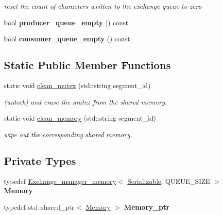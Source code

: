 \begin{DoxyCompactItemize}
\begin{DoxyCompactList}\small\item\em reset the count of characters written to the exchange queue to zero \end{DoxyCompactList}\item 
\mbox{\label{classshared__memory_1_1Exchange__manager__producer_a4a38c8c14004bc46d254375a63f62096}} 
bool {\bfseries producer\+\_\+queue\+\_\+empty} () const
\item 
\mbox{\label{classshared__memory_1_1Exchange__manager__producer_ab8f5eef0601cfdb418eb5d521bfa33d0}} 
bool {\bfseries consumer\+\_\+queue\+\_\+empty} () const
\end{DoxyCompactItemize}
\subsection*{Static Public Member Functions}
\begin{DoxyCompactItemize}
\item 
static void \hyperlink{classshared__memory_1_1Exchange__manager__producer_af98fe4321e1fd280b509f5dfd2cf4a5b}{clean\+\_\+mutex} (std\+::string segment\+\_\+id)
\begin{DoxyCompactList}\small\item\em (unlock) and erase the mutex from the shared memory. \end{DoxyCompactList}\item 
static void \hyperlink{classshared__memory_1_1Exchange__manager__producer_a8574f4e075d6f755e567d21d04f24aab}{clean\+\_\+memory} (std\+::string segment\+\_\+id)
\begin{DoxyCompactList}\small\item\em wipe out the corresponding shared memory. \end{DoxyCompactList}\end{DoxyCompactItemize}
\subsection*{Private Types}
\begin{DoxyCompactItemize}
\item 
\mbox{\label{classshared__memory_1_1Exchange__manager__producer_a65119cf07c0c10f167c191c9ee913029}} 
typedef \hyperlink{classshared__memory_1_1internal_1_1Exchange__manager__memory}{Exchange\+\_\+manager\+\_\+memory}$<$ \hyperlink{classSerializable}{Serializable}, Q\+U\+E\+U\+E\+\_\+\+S\+I\+ZE $>$ {\bfseries Memory}
\item 
\mbox{\label{classshared__memory_1_1Exchange__manager__producer_a7f3d7760ca2d1c01fa88e7a6447a38d7}} 
typedef std\+::shared\+\_\+ptr$<$ \hyperlink{classshared__memory_1_1internal_1_1Exchange__manager__memory}{Memory} $>$ {\bfseries Memory\+\_\+ptr}
\end{DoxyCompactItemize}
